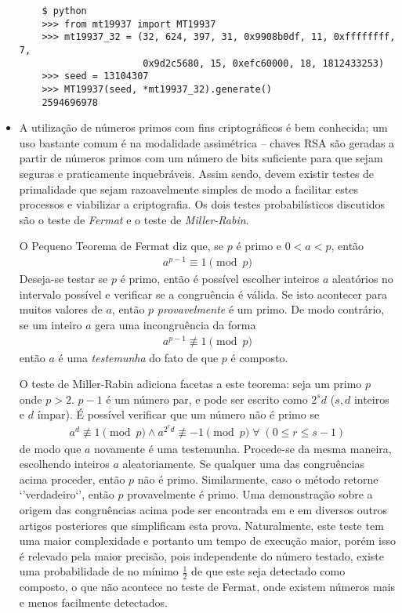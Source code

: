 \documentclass{article}
\begin{document}
\begin{itemize}
\begin{verbatim}
    $ python
    >>> from mt19937 import MT19937
    >>> mt19937_32 = (32, 624, 397, 31, 0x9908b0df, 11, 0xffffffff, 7,
                      0x9d2c5680, 15, 0xefc60000, 18, 1812433253)
    >>> seed = 13104307
    >>> MT19937(seed, *mt19937_32).generate()
    2594696978
\end{verbatim}

\item A utilização de números primos com fins criptográficos é bem conhecida;
um uso bastante comum é na modalidade assimétrica -- chaves RSA são geradas a
partir de números primos com um número de bits suficiente para que sejam
seguras e praticamente inquebráveis. Assim sendo, devem existir testes de
primalidade que sejam razoavelmente simples de modo a facilitar estes
processos e viabilizar a criptografia. Os dois testes probabilísticos
discutidos são o teste de \emph{Fermat} e o teste de \emph{Miller-Rabin}.

O Pequeno Teorema de Fermat diz que, se $p$ é primo e $0 < a < p$, então
\begin{align*}
a^{p-1} \equiv 1 \pmod{p}
\end{align*}
Deseja-se testar se $p$ é primo, então é possível escolher inteiros $a$
aleatórios no intervalo possível e verificar se a congruência é válida. Se
isto acontecer para muitos valores de $a$, então $p$ \emph{provavelmente} é um
primo. De modo contrário, se um inteiro $a$ gera uma incongruência da forma
\begin{align*}a^{p-1} \not\equiv 1 \pmod{p}\end{align*}
então $a$ é uma \emph{testemunha} do fato de que $p$ é composto.

O teste de Miller-Rabin adiciona facetas a este teorema: seja um primo $p$
onde $p > 2$. $p - 1$ é um número par, e pode ser escrito como $2^s d$ ($s,
d$ inteiros e $d$ ímpar). É possível verificar que um número não é primo se
\begin{align*}
a^d \not\equiv 1 \pmod{p} \land
a^{2^{r}d} \not\equiv -1 \pmod{p} \; \forall \; (0 \leq r \leq s-1)
\end{align*}
de modo que $a$ novamente é uma testemunha. Procede-se da mesma maneira,
escolhendo inteiros $a$ aleatoriamente. Se qualquer uma das congruências acima
proceder, então $p$ não é primo. Similarmente, caso o método retorne
`'verdadeiro`', então $p$ provavelmente é primo. Uma demonstração sobre a
origem das congruências acima pode ser encontrada em
\cite{Miller:1976:RHT:1739937.1740086} e em diversos outros artigos
posteriores que simplificam esta prova. Naturalmente, este teste tem uma
maior complexidade e portanto um tempo de execução maior, porém isso é
relevado pela maior precisão, pois independente do número testado, existe
uma probabilidade de no mínimo $\frac{1}{2}$ de que este seja detectado como
composto, o que não acontece no teste de Fermat, onde existem números
mais e menos facilmente detectados.


\end{itemize}
\end{document}

